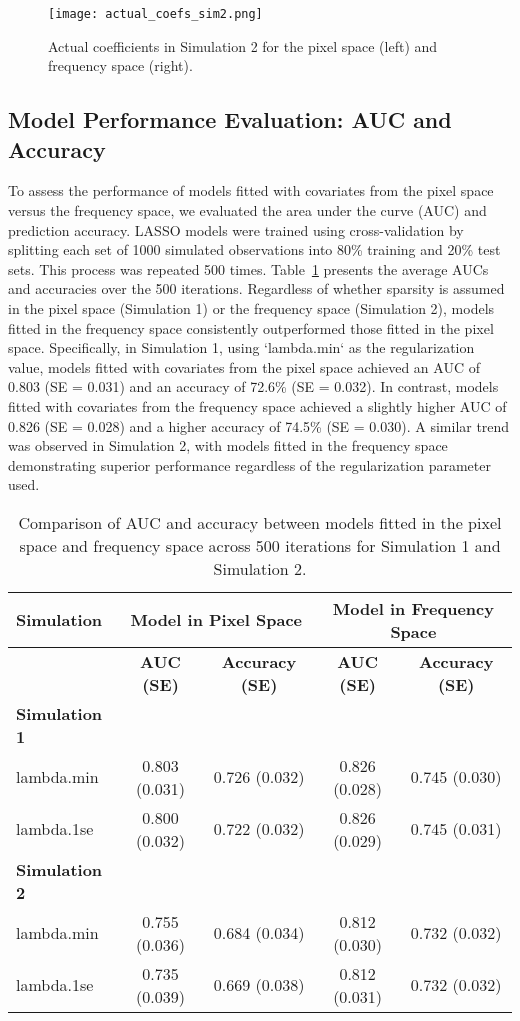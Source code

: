 \documentclass[12pt]{article}
\begin{document}
\begin{figure}[h!] 
	\centering
	\texttt{[image: actual\_coefs\_sim2.png]}
  \caption{Actual coefficients in Simulation 2 for the pixel space (left) and frequency space (right).}
  \label{fig:coefs_sim2}
\end{figure}

\FloatBarrier

\subsection*{Model Performance Evaluation: AUC and Accuracy}

To assess the performance of models fitted with covariates from the pixel space versus the frequency space, we evaluated
the area under the curve (AUC) and prediction accuracy. LASSO models were trained using cross-validation by splitting
each set of 1000 simulated observations into 80\% training and 20\% test sets. This process was repeated 500 times.
Table~\ref*{tab:auc_acc_table} presents the average AUCs and accuracies over the 500 iterations. Regardless of whether
sparsity is assumed in the pixel space (Simulation 1) or the frequency space (Simulation 2), models fitted in the
frequency space consistently outperformed those fitted in the pixel space. Specifically, in Simulation 1, using
`lambda.min` as the regularization value, models fitted with covariates from the pixel space achieved an AUC of
0.803 (SE = 0.031) and an accuracy of 72.6\% (SE = 0.032). In contrast, models fitted with covariates from the 
frequency space achieved a slightly higher AUC of 0.826 (SE = 0.028) and a higher accuracy of
74.5\% (SE = 0.030). A similar trend was observed in Simulation 2, with models fitted in the frequency space
demonstrating superior performance regardless of the regularization parameter used.

\begin{table}[h!]
\centering
\caption{Comparison of AUC and accuracy between models fitted in the pixel space and frequency space across 500 iterations for Simulation 1 and Simulation 2.}
\label{tab:auc_acc_table}
\begin{tabular}{l|cc|cc}
\toprule
\textbf{Simulation} & \multicolumn{2}{c}{\textbf{Model in Pixel Space}} & \multicolumn{2}{c}{\textbf{Model in Frequency Space}} \\ 
\midrule
& \textbf{AUC (SE)} & \textbf{Accuracy (SE)} & \textbf{AUC (SE)} & \textbf{Accuracy (SE)} \\ 
\midrule
\textbf{Simulation 1} & & & & \\
lambda.min & 0.803 (0.031) & 0.726 (0.032) & 0.826 (0.028) & 0.745 (0.030) \\
lambda.1se & 0.800 (0.032) & 0.722 (0.032) & 0.826 (0.029) & 0.745 (0.031) \\ 
\midrule
\textbf{Simulation 2} & & & & \\
lambda.min & 0.755 (0.036) & 0.684 (0.034) & 0.812 (0.030) & 0.732 (0.032)  \\
lambda.1se & 0.735 (0.039) & 0.669 (0.038) & 0.812 (0.031) & 0.732 (0.032) \\
\bottomrule
\end{tabular}
\end{table}
\end{document}
